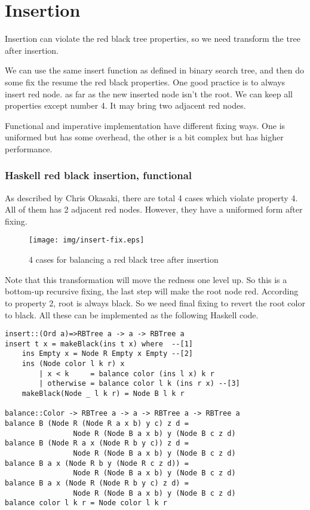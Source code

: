 \documentclass{article}
\begin{document}
\section{Insertion}

Insertion can violate the red black tree properties, so we need transform
the tree after insertion.

We can use the same insert function as defined in binary search tree, and 
then do some fix the resume the red black properties. One good practice is 
to always insert red node. as far as the new inserted node isn't the root.
We can keep all properties except number 4. It may bring two adjacent red
nodes.

Functional and imperative implementation have different fixing ways. One
is uniformed but has some overhead, the other is a bit complex but has 
higher performance.

\subsubsection*{Haskell red black insertion, functional}
As described by Chris Okasaki, there are total 4 cases which violate property 4.
All of them has 2 adjacent red nodes. However, they have a uniformed form
after fixing\cite{okasaki}. 

\begin{figure}[htbp]
       \begin{center}
	\texttt{[image: img/insert-fix.eps]}
        \caption{4 cases for balancing a red black tree after insertion} \label{fig:insert-fix}
       \end{center}
\end{figure}

Note that this transformation will move the redness one level up. So this is a bottom-up recursive fixing, the last step will make the root node red. According
to property 2, root is always black. So we need final fixing to revert the root
color to black. All these can be implemented as the following Haskell code.

\lstset{language=Haskell}
\begin{lstlisting}
insert::(Ord a)=>RBTree a -> a -> RBTree a
insert t x = makeBlack(ins t x) where  --[1]
    ins Empty x = Node R Empty x Empty --[2]
    ins (Node color l k r) x 
        | x < k     = balance color (ins l x) k r
        | otherwise = balance color l k (ins r x) --[3]
    makeBlack(Node _ l k r) = Node B l k r

balance::Color -> RBTree a -> a -> RBTree a -> RBTree a
balance B (Node R (Node R a x b) y c) z d = 
                Node R (Node B a x b) y (Node B c z d)
balance B (Node R a x (Node R b y c)) z d = 
                Node R (Node B a x b) y (Node B c z d)
balance B a x (Node R b y (Node R c z d)) = 
                Node R (Node B a x b) y (Node B c z d)
balance B a x (Node R (Node R b y c) z d) = 
                Node R (Node B a x b) y (Node B c z d)
balance color l k r = Node color l k r
\end{lstlisting}
\end{document}
